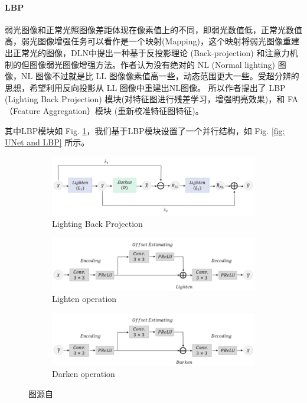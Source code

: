 \documentclass[a4paper]{ctexart}
\begin{document}
		\paragraph{LBP}
		
		弱光图像和正常光照图像差距体现在像素值上的不同，即弱光数值低，正常光数值高，弱光图像增强任务可以看作是一个映射(Mapping)，这个映射将弱光图像重建出正常光的图像，DLN\cite{DLN2020}中提出一种基于反投影理论 (Back-projection) 和注意力机制的但图像弱光图像增强方法。作者认为没有绝对的 NL (Normal lighting) 图像，NL 图像不过就是比 LL 图像像素值高一些，动态范围更大一些。受超分辨\cite{haris2018deep}的思想，希望利用反向投影从 LL 图像中重建出NL图像。 所以作者提出了 LBP (Lighting Back Projection) 模块(对特征图进行残差学习，增强明亮效果)，和 FA（Feature Aggregation）模块 (重新校准特征图特征)。

		其中LBP模块如 Fig. \ref{fig: LBP}，我们基于LBP模块设置了一个并行结构，如 Fig. \ref{fig: UNet and LBP} 所示。
		
		\begin{figure}[htbp]
			\centering
			\begin{subfigure}{0.8\textwidth}
				\includegraphics[width=\linewidth]{picture/LLIE/Experiment/LBP}
				\captionsetup{font=scriptsize}
				\caption{Lighting Back Projection}
				\label{fig: LBP}
			\end{subfigure}
			\begin{subfigure}{0.8\textwidth}
				\includegraphics[width=\linewidth]{picture/LLIE/Experiment/Lighten operation}
				\captionsetup{font=scriptsize}
				\caption{Lighten operation}
				\label{fig: Lighten operation}	
			\end{subfigure}
			\begin{subfigure}{0.8\textwidth}
				\includegraphics[width=\linewidth]{picture/LLIE/Experiment/Darken operation}
				\captionsetup{font=scriptsize}
				\caption{Darken operation}
				\label{fig: Darken operation}	
			\end{subfigure}
			\caption{图源自\cite{shen2022low}}
		\end{figure}
		
\end{document}
